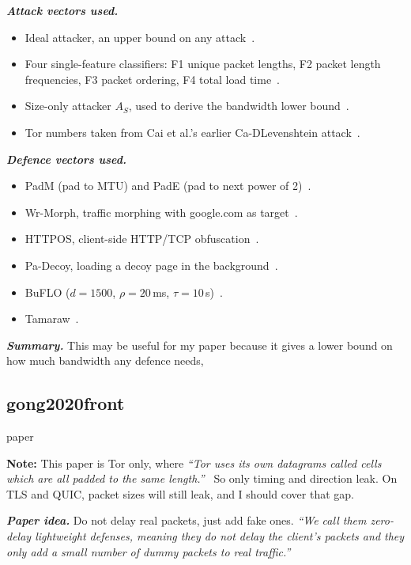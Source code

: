 \textbf{\textit{Attack vectors used.}}
\begin{itemize}
    \item Ideal attacker, an upper bound on any attack~\cite[\S1, \S6.2.1]{cai2014tamaraw}.
    \item Four single-feature classifiers: F1 unique packet lengths, F2 packet length frequencies, F3 packet ordering, F4 total load time~\cite[\S3.3]{cai2014tamaraw}.
    \item Size-only attacker $A_S$, used to derive the bandwidth lower bound~\cite[\S5.1.2]{cai2014tamaraw}.
    \item Tor numbers taken from Cai et al.'s earlier Ca-DLevenshtein attack~\cite[\S6.2.2]{cai2014tamaraw}.
\end{itemize}

\textbf{\textit{Defence vectors used.}}
\begin{itemize}
    \item PadM (pad to MTU) and PadE (pad to next power of 2)~\cite[\S4.1]{cai2014tamaraw}.
    \item Wr-Morph, traffic morphing with google.com as target~\cite[\S4.1]{cai2014tamaraw}.
    \item HTTPOS, client-side HTTP/TCP obfuscation~\cite[\S4.1]{cai2014tamaraw}.
    \item Pa-Decoy, loading a decoy page in the background~\cite[\S4.1]{cai2014tamaraw}.
    \item BuFLO ($d=1500$, $\rho=20$\,ms, $\tau=10$\,s)~\cite[\S4.1]{cai2014tamaraw}.
    \item Tamaraw~\cite[\S6]{cai2014tamaraw}.
\end{itemize}

\textbf{\textit{Summary.}}
This may be useful for my paper because it gives a lower bound on how much bandwidth any defence needs,


\subsection{gong2020front}
paper~\cite{gong2020front}

\textbf{Note:} This paper is Tor only, where \textit{``Tor uses its own datagrams called cells which are all padded to the same length.''}~\cite[p.~720]{gong2020front} So only timing and direction leak. On TLS and QUIC, packet sizes will still leak, and I should cover that gap.

\textbf{\textit{Paper idea.}}
Do not delay real packets, just add fake ones. \textit{``We call them zero-delay lightweight defenses, meaning they do not delay the client's packets and they only add a small number of dummy packets to real traffic.''}~\cite[p.~717]{gong2020front}

